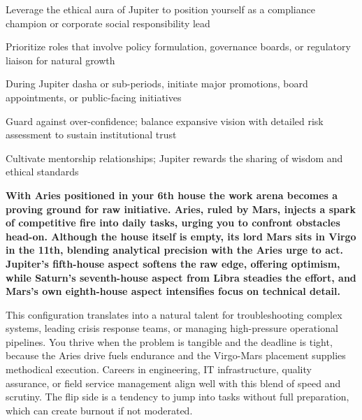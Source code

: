 \begin{diamondlist}
  \item {\fontsize{8.5}{12}\selectfont Leverage the ethical aura of Jupiter to position yourself as a compliance champion or corporate social responsibility lead}
  \item {\fontsize{8.5}{12}\selectfont Prioritize roles that involve policy formulation, governance boards, or regulatory liaison for natural growth}
  \item {\fontsize{8.5}{12}\selectfont During Jupiter dasha or sub-periods, initiate major promotions, board appointments, or public-facing initiatives}
  \item {\fontsize{8.5}{12}\selectfont Guard against over-confidence; balance expansive vision with detailed risk assessment to sustain institutional trust}
  \item {\fontsize{8.5}{12}\selectfont Cultivate mentorship relationships; Jupiter rewards the sharing of wisdom and ethical standards}
\end{diamondlist}


\label{topic14}

{\fontsize{9.5}{13.8}\selectfont\bfseries\color{DeepSlate} With Aries positioned in your 6th house the work arena becomes a proving ground for raw initiative. Aries, ruled by Mars, injects a spark of competitive fire into daily tasks, urging you to confront obstacles head-on. Although the house itself is empty, its lord Mars sits in Virgo in the 11th, blending analytical precision with the Aries urge to act. Jupiter's fifth-house aspect softens the raw edge, offering optimism, while Saturn's seventh-house aspect from Libra steadies the effort, and Mars's own eighth-house aspect intensifies focus on technical detail.}\par\vspace{2mm}

{\fontsize{9}{13}\selectfont This configuration translates into a natural talent for troubleshooting complex systems, leading crisis response teams, or managing high-pressure operational pipelines. You thrive when the problem is tangible and the deadline is tight, because the Aries drive fuels endurance and the Virgo-Mars placement supplies methodical execution. Careers in engineering, IT infrastructure, quality assurance, or field service management align well with this blend of speed and scrutiny. The flip side is a tendency to jump into tasks without full preparation, which can create burnout if not moderated.}\par\vspace{1.8mm}

